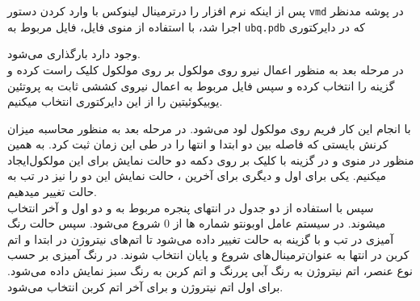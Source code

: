 پس از اینکه نرم افزار  را در‌ترمینال لینوکس با وارد کردن دستور \verb*|vmd| در پوشه مدنظر اجرا شد، با استفاده از منوی فایل، فایل مربوط به \verb*|ubq.pdb| که در دایرکتوری
\begin{flushleft}
\end{flushleft}
 وجود دارد بارگذاری می‌شود.
\\
در مرحله بعد به منظور اعمال نیرو روی مولکول بر روی مولکول کلیک راست کرده و گزینه  را انتخاب کرده و سپس فایل مربوط به اعمال نیروی کششی ثابت به پروتئین یوبیکوئیتین را از این دایرکتوری انتخاب میکنیم.
\begin{flushleft}
\end{flushleft}
با انجام این کار  فریم روی مولکول لود می‌شود.
در مرحله بعد به منظور محاسبه میزان کرنش بایستی که فاصله بین دو  ابتدا و انتها را در طی این زمان ثبت کرد. به همین منظور در منوی  و در گزینه  با کلیک بر روی دکمه  دو حالت نمایش برای این مولکول‌ایجاد میکنیم. یکی برای  اول و دیگری برای آخرین ، حالت نمایش این دو را نیز در تب  به حالت  تغییر میدهیم.
\\
سپس با استفاده از دو جدول در انتهای پنجره مربوط به  و  دو  اول و آخر انتخاب میشوند. در سیستم عامل اوبونتو شماره  ‌ها از 0 شروع می‌شود.
سپس حالت رنگ آمیزی در تب  و با گزینه  به حالت  تغییر داده می‌شود تا اتم‌‌های نیتروژن در ابتدا و اتم کربن در انتها به عنوان‌ترمینال‌‌های شروع و پایان انتخاب شوند.
در رنگ آمیزی بر حسب نوع عنصر، اتم نیتروژن به رنگ آبی پررنگ و اتم کربن به رنگ سبز نمایش داده می‌شود. برای  اول اتم نیتروژن و برای  آخر اتم کربن انتخاب می‌شود.

